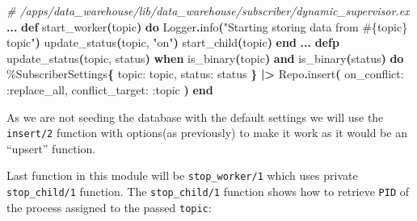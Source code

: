 \documentclass[
  oneside]{book}
\newenvironment{Shaded}{\begin{snugshade}}{\end{snugshade}}
\newcommand{\CommentTok}[1]{\textcolor[rgb]{0.56,0.35,0.01}{\textit{#1}}}
\newcommand{\ConstantTok}[1]{\textcolor[rgb]{0.56,0.35,0.01}{#1}}
\newcommand{\FunctionTok}[1]{\textcolor[rgb]{0.13,0.29,0.53}{\textbf{#1}}}
\newcommand{\KeywordTok}[1]{\textcolor[rgb]{0.13,0.29,0.53}{\textbf{#1}}}
\newcommand{\NormalTok}[1]{#1}
\newcommand{\OperatorTok}[1]{\textcolor[rgb]{0.81,0.36,0.00}{\textbf{#1}}}
\newcommand{\OtherTok}[1]{\textcolor[rgb]{0.56,0.35,0.01}{#1}}
\newcommand{\StringTok}[1]{\textcolor[rgb]{0.31,0.60,0.02}{#1}}
\newcommand{\VariableTok}[1]{\textcolor[rgb]{0.00,0.00,0.00}{#1}}
\begin{document}
\begin{Shaded}
\begin{Highlighting}[]
  \CommentTok{\# /apps/data\_warehouse/lib/data\_warehouse/subscriber/dynamic\_supervisor.ex}
  \OperatorTok{...}
  \KeywordTok{def}\NormalTok{ start\_worker}\FunctionTok{(}\NormalTok{topic}\FunctionTok{)} \KeywordTok{do}
    \ConstantTok{Logger}\OperatorTok{.}\NormalTok{info}\FunctionTok{(}\StringTok{"Starting storing data from }\OtherTok{\#\{}\NormalTok{topic}\OtherTok{\}}\StringTok{ topic"}\FunctionTok{)}
\NormalTok{    update\_status}\FunctionTok{(}\NormalTok{topic, }\StringTok{"on"}\FunctionTok{)}
\NormalTok{    start\_child}\FunctionTok{(}\NormalTok{topic}\FunctionTok{)}
  \KeywordTok{end}
  \OperatorTok{...}
  \KeywordTok{defp}\NormalTok{ update\_status}\FunctionTok{(}\NormalTok{topic, status}\FunctionTok{)}
       \KeywordTok{when}\NormalTok{ is\_binary}\FunctionTok{(}\NormalTok{topic}\FunctionTok{)} \KeywordTok{and}\NormalTok{ is\_binary}\FunctionTok{(}\NormalTok{status}\FunctionTok{)} \KeywordTok{do}
\NormalTok{    \%}\ConstantTok{SubscriberSettings}\FunctionTok{\{}
      \VariableTok{topic:}\NormalTok{ topic,}
      \VariableTok{status:}\NormalTok{ status}
    \FunctionTok{\}}
    \OperatorTok{|\textgreater{}} \ConstantTok{Repo}\OperatorTok{.}\NormalTok{insert}\FunctionTok{(}
      \VariableTok{on\_conflict:} \VariableTok{:replace\_all}\NormalTok{,}
      \VariableTok{conflict\_target:} \VariableTok{:topic}
    \FunctionTok{)}
  \KeywordTok{end}
\end{Highlighting}
\end{Shaded}

As we are not seeding the database with the default settings we will use the \texttt{insert/2} function with options(as previously) to make it work as it would be an ``upsert'' function.

Last function in this module will be \texttt{stop\_worker/1} which uses private \texttt{stop\_child/1} function. The \texttt{stop\_child/1} function shows how to retrieve \texttt{PID} of the process assigned to the passed \texttt{topic}:
\end{document}
